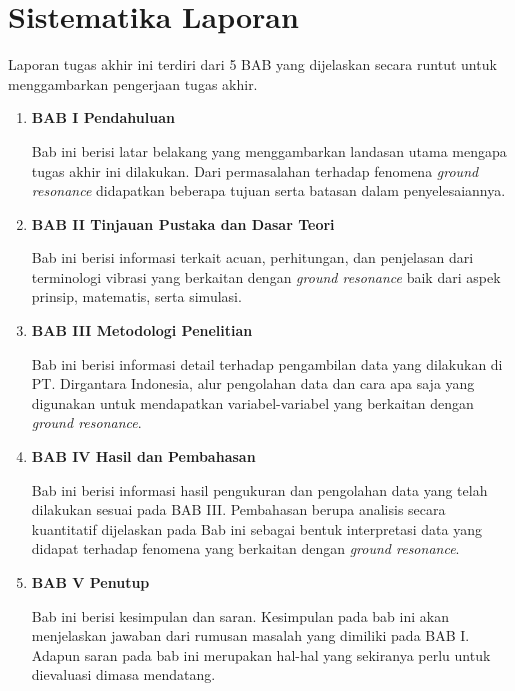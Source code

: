 \section{Sistematika Laporan}
\label{sec:sistematikalaporan}

Laporan tugas akhir ini terdiri dari 5 BAB yang dijelaskan secara runtut untuk menggambarkan pengerjaan tugas akhir.

\begin{enumerate}[nolistsep]

  \item \textbf{BAB I Pendahuluan}

        Bab ini berisi latar belakang yang menggambarkan landasan utama mengapa tugas akhir ini dilakukan. Dari permasalahan terhadap fenomena \textit{ground resonance} didapatkan beberapa tujuan serta batasan dalam penyelesaiannya.

        \vspace{2ex}

  \item \textbf{BAB II Tinjauan Pustaka dan Dasar Teori}

        Bab ini berisi informasi terkait acuan, perhitungan, dan penjelasan dari terminologi vibrasi yang berkaitan dengan \textit{ground resonance} baik dari aspek prinsip, matematis, serta simulasi.

        \vspace{2ex}

  \item \textbf{BAB III Metodologi Penelitian}

        Bab ini berisi informasi detail terhadap pengambilan data yang dilakukan di PT. Dirgantara Indonesia, alur pengolahan data dan cara apa saja yang digunakan untuk mendapatkan variabel-variabel yang berkaitan dengan \textit{ground resonance}.

        \vspace{2ex}

  \item \textbf{BAB IV Hasil dan Pembahasan}

        Bab ini berisi informasi hasil pengukuran dan pengolahan data yang telah dilakukan sesuai pada BAB III. Pembahasan berupa analisis secara kuantitatif dijelaskan pada Bab ini sebagai bentuk interpretasi data yang didapat terhadap fenomena yang berkaitan dengan \textit{ground resonance}.

        \vspace{2ex}

  \item \textbf{BAB V Penutup}

        Bab ini berisi kesimpulan dan saran. Kesimpulan pada bab ini akan menjelaskan jawaban dari rumusan masalah yang dimiliki pada BAB I. Adapun saran pada bab ini merupakan hal-hal yang sekiranya perlu untuk dievaluasi dimasa mendatang.

\end{enumerate}

